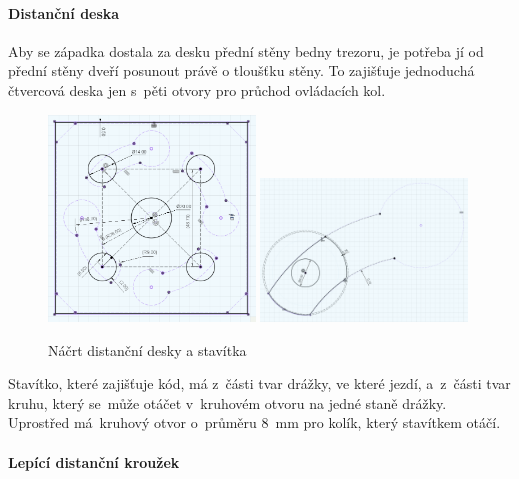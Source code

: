 \paragraph{Distanční deska}

Aby se západka dostala za desku přední stěny bedny trezoru, je potřeba jí od přední stěny dveří posunout právě o tloušťku stěny. To zajišťuje jednoduchá čtvercová deska jen s~pěti otvory
pro průchod ovládacích kol.

\begin{figure}[h]
	\centering
    \includegraphics[width=0.49\textwidth]{kapitoly/obrazky/M3/distancka.png}
    \includegraphics[width=0.49\textwidth]{kapitoly/obrazky/M3/kamen.png}
    \caption{Náčrt distanční desky a stavítka}
    \label{fig:M3-kamen}
    \label{fig:M3-distancka}
\end{figure}

Stavítko, které zajišťuje kód, má z~části tvar drážky, ve které jezdí, a~z~části tvar kruhu, který se~může otáčet v~kruhovém otvoru na jedné staně drážky.
Uprostřed má~kruhový otvor o~průměru 8~mm pro kolík, který stavítkem otáčí.

\paragraph{Lepící distanční kroužek}

